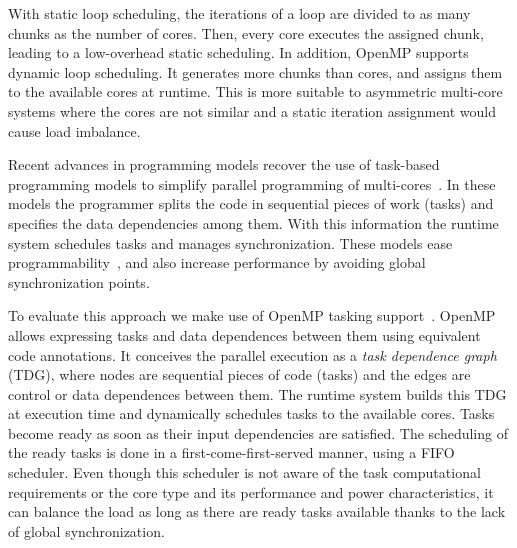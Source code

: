 With static loop scheduling, the iterations of a loop are divided to as many chunks as the number of cores.
Then, every core executes the assigned chunk, leading to a low-overhead static scheduling.
In addition, OpenMP supports dynamic loop scheduling. 
It generates more chunks than cores, and assigns them to the available cores at runtime. 
This is more suitable to asymmetric multi-core systems where the cores are not similar and a static iteration assignment would cause load imbalance.

Recent advances in programming models recover the use of task-based programming models to simplify parallel programming of multi-cores~\cite{OpenMP4.0:Manual2013, OmpSs_PPL11, Zuckerman:EXADAPT2011, Bauer.2012.SC, Vandierendonck:PACT2011}. 
In these models the programmer splits the code in sequential pieces of work (tasks) and specifies the data dependencies among them.  
With this information the runtime system schedules tasks and manages synchronization. These models ease programmability~\cite{OpenMP4.0:Manual2013, OmpSs_PPL11, Zuckerman:EXADAPT2011, Bauer.2012.SC, Vandierendonck:PACT2011, Vandierendonck:Hyperq},
and also increase performance by avoiding global synchronization points.

To evaluate this approach we make use of OpenMP tasking support~\cite{OpenMP4.0:Manual2013}. 
OpenMP allows expressing tasks and data dependences between them using equivalent code annotations. 
It conceives the parallel execution as a \emph{task dependence graph} (TDG), where nodes are 
sequential pieces of code (tasks) and the edges are control or data dependences between them. 
The runtime system builds this TDG at execution time and dynamically schedules tasks to the available cores.
Tasks become ready as soon as their input dependencies are satisfied.
The scheduling of the ready tasks is done in a first-come-first-served manner, using a FIFO scheduler.  
Even though this scheduler is not aware of the task computational requirements or the core type and its performance and power characteristics, it can balance the load as long as there are ready tasks available thanks to the lack of global synchronization.


